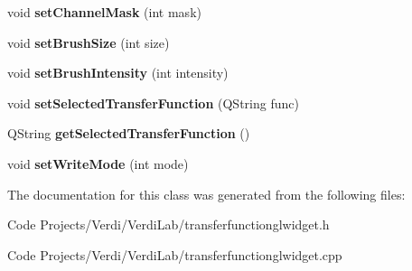 \begin{DoxyCompactItemize}
\item 
\hypertarget{class_transfer_function_g_l_widget_a6bf30ff245bebb4cc39773b15d113117}{void {\bfseries set\-Channel\-Mask} (int mask)}\label{class_transfer_function_g_l_widget_a6bf30ff245bebb4cc39773b15d113117}

\item 
\hypertarget{class_transfer_function_g_l_widget_a90f9b626b7790cd6918b1503804c0f3d}{void {\bfseries set\-Brush\-Size} (int size)}\label{class_transfer_function_g_l_widget_a90f9b626b7790cd6918b1503804c0f3d}

\item 
\hypertarget{class_transfer_function_g_l_widget_a3eb905cc3006da29ba327ef5ca2a1cde}{void {\bfseries set\-Brush\-Intensity} (int intensity)}\label{class_transfer_function_g_l_widget_a3eb905cc3006da29ba327ef5ca2a1cde}

\item 
\hypertarget{class_transfer_function_g_l_widget_a5059d3dd41f4c738824d81c04fea9d10}{void {\bfseries set\-Selected\-Transfer\-Function} (\-Q\-String func)}\label{class_transfer_function_g_l_widget_a5059d3dd41f4c738824d81c04fea9d10}

\item 
\hypertarget{class_transfer_function_g_l_widget_a8e7948214bebd7b9846726cb4694d652}{\-Q\-String {\bfseries get\-Selected\-Transfer\-Function} ()}\label{class_transfer_function_g_l_widget_a8e7948214bebd7b9846726cb4694d652}

\item 
\hypertarget{class_transfer_function_g_l_widget_a465be1a47d7d80507a847746da48946a}{void {\bfseries set\-Write\-Mode} (int mode)}\label{class_transfer_function_g_l_widget_a465be1a47d7d80507a847746da48946a}

\end{DoxyCompactItemize}


\-The documentation for this class was generated from the following files\-:\begin{DoxyCompactItemize}
\item 
\-Code Projects/\-Verdi/\-Verdi\-Lab/transferfunctionglwidget.\-h\item 
\-Code Projects/\-Verdi/\-Verdi\-Lab/transferfunctionglwidget.\-cpp\end{DoxyCompactItemize}
